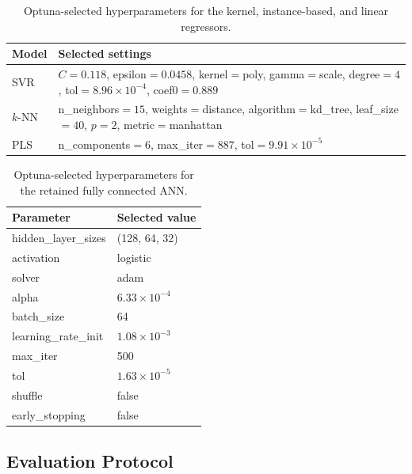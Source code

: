 \documentclass[a4paper,fleqn]{cas-sc}
\newenvironment{revblock}{\begingroup\color{revDefault}}{\endgroup}
\newenvironment{revblockr24}{\begingroup\color{revRtwoFour}}{\endgroup}
\newenvironment{revblockr25}{\begingroup\color{revRtwoFive}}{\endgroup}
\begin{document}
\begin{revblock}
\begin{revblockr24}
\begin{table}[H]
\centering
\caption{Optuna-selected hyperparameters for the kernel, instance-based, and linear regressors.}
\label{tab:optuna_classical_b}
\scriptsize
\begin{tabular}{>{\raggedright\arraybackslash}p{2.1cm}>{\raggedright\arraybackslash}p{9.0cm}}
\hline
Model & Selected settings \\
\hline
SVR & $C=0.118$, epsilon$=0.0458$, kernel$=$poly, gamma$=$scale, degree$=4$, tol$=8.96 \times 10^{-4}$, coef0$=0.889$ \\
$k$-NN & n\_neighbors$=15$, weights$=$distance, algorithm$=$kd\_tree, leaf\_size$=40$, $p=2$, metric$=$manhattan \\
PLS & n\_components$=6$, max\_iter$=887$, tol$=9.91 \times 10^{-5}$ \\
\hline
\end{tabular}
\end{table}

\begin{table}[H]
\centering
\caption{Optuna-selected hyperparameters for the retained fully connected ANN.}
\label{tab:optuna_mlp}
\scriptsize
\begin{tabular}{ll}
\hline
Parameter & Selected value \\
\hline
hidden\_layer\_sizes & (128, 64, 32) \\
activation & logistic \\
solver & adam \\
alpha & $6.33 \times 10^{-4}$ \\
batch\_size & 64 \\
learning\_rate\_init & $1.08 \times 10^{-3}$ \\
max\_iter & 500 \\
tol & $1.63 \times 10^{-5}$ \\
shuffle & false \\
early\_stopping & false \\
\hline
\end{tabular}
\end{table}
\end{revblockr24}

\begin{revblockr25}
\subsection{Evaluation Protocol}


\end{revblockr25}
\end{revblock}
\end{document}
